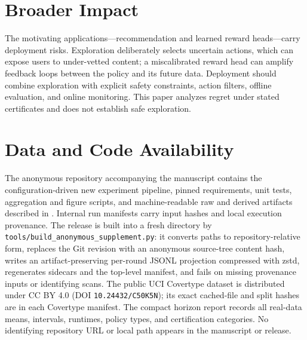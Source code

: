 \documentclass[twoside]{article}
\begin{document}
\section{Broader Impact}\label{app:impact}
The motivating applications---recommendation and learned reward heads---carry
deployment risks.  Exploration deliberately selects uncertain actions, which can
expose users to under-vetted content; a miscalibrated reward head can amplify
feedback loops between the policy and its future data.  Deployment should combine
exploration with explicit safety constraints, action filters, offline evaluation,
and online monitoring.  This paper analyzes regret under stated certificates and
does not establish safe exploration.

\section{Data and Code Availability}\label{app:availability}
The anonymous repository accompanying the manuscript contains the configuration-driven
new experiment pipeline, pinned requirements, unit tests, aggregation and figure
scripts, and machine-readable raw and derived artifacts described in
.  Internal run manifests carry input hashes and local
execution provenance.  The release is built into a fresh directory by
\nolinkurl{tools/build_anonymous_supplement.py}: it converts paths to
repository-relative form, replaces the Git revision with an anonymous source-tree
content hash, writes an artifact-preserving per-round JSONL projection compressed
with zstd, regenerates sidecars and the
top-level manifest, and fails on missing provenance inputs or identifying scans.
The public UCI Covertype dataset
\citep{blackard1998covertype} is distributed under CC BY 4.0 (DOI
\texttt{10.24432/C50K5N}); its exact cached-file and split hashes are in each
Covertype manifest.  The compact horizon report records all real-data means,
intervals, runtimes, policy types, and certification categories.  No identifying
repository URL or local path appears in the manuscript or release.
\end{document}
